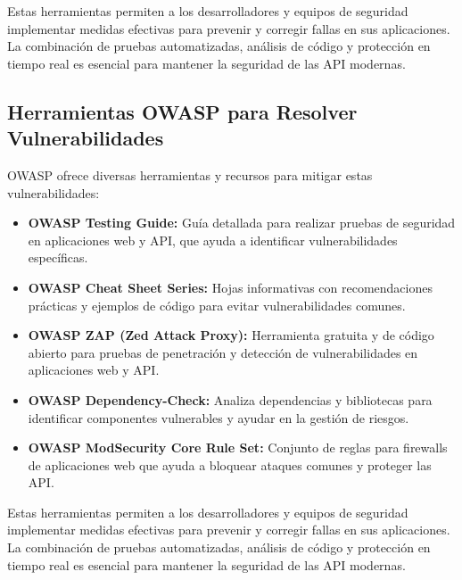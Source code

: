 \documentclass[a4paper,12pt]{article}
\begin{document}
Estas herramientas permiten a los desarrolladores y equipos de seguridad implementar medidas efectivas para prevenir y corregir fallas en sus aplicaciones. La combinación de pruebas automatizadas, análisis de código y protección en tiempo real es esencial para mantener la seguridad de las API modernas.

\subsection{Herramientas OWASP para Resolver Vulnerabilidades}
OWASP ofrece diversas herramientas y recursos para mitigar estas vulnerabilidades:

\begin{itemize}
    \item \textbf{OWASP Testing Guide:} Guía detallada para realizar pruebas de seguridad en aplicaciones web y API, que ayuda a identificar vulnerabilidades específicas.
    \item \textbf{OWASP Cheat Sheet Series:} Hojas informativas con recomendaciones prácticas y ejemplos de código para evitar vulnerabilidades comunes.
    \item \textbf{OWASP ZAP (Zed Attack Proxy):} Herramienta gratuita y de código abierto para pruebas de penetración y detección de vulnerabilidades en aplicaciones web y API.
    \item \textbf{OWASP Dependency-Check:} Analiza dependencias y bibliotecas para identificar componentes vulnerables y ayudar en la gestión de riesgos.
    \item \textbf{OWASP ModSecurity Core Rule Set:} Conjunto de reglas para firewalls de aplicaciones web que ayuda a bloquear ataques comunes y proteger las API.
\end{itemize}

Estas herramientas permiten a los desarrolladores y equipos de seguridad implementar medidas efectivas para prevenir y corregir fallas en sus aplicaciones. La combinación de pruebas automatizadas, análisis de código y protección en tiempo real es esencial para mantener la seguridad de las API modernas.
\end{document}
